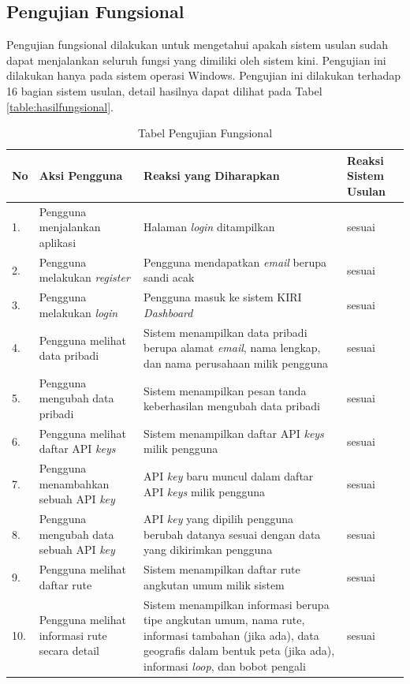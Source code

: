 \subsection{Pengujian Fungsional}
\label{sec:pengujianfungsional}
Pengujian fungsional dilakukan untuk mengetahui apakah sistem usulan sudah dapat menjalankan seluruh fungsi yang dimiliki oleh sistem kini. Pengujian ini dilakukan hanya pada sistem operasi Windows. Pengujian ini dilakukan terhadap 16 bagian sistem usulan, detail hasilnya dapat dilihat pada Tabel \ref{table:hasilfungsional}.

\begin{table}[H]
	\centering
	\caption{Tabel Pengujian Fungsional}
		\begin{tabular}{|p{0.37cm}| p{3.5cm}| p{7cm}| p{2.5cm}|} \hline
		No & Aksi Pengguna	& Reaksi yang Diharapkan & Reaksi Sistem Usulan \\ \hline
		1. & Pengguna menjalankan aplikasi & Halaman \textit{login} ditampilkan & sesuai \\ \hline
		2. & Pengguna melakukan \textit{register} & Pengguna mendapatkan \textit{email} berupa sandi acak & sesuai \\ \hline
		3. & Pengguna melakukan \textit{login} & Pengguna masuk ke sistem KIRI \textit{Dashboard} & sesuai	\\ \hline
		4. & Pengguna melihat data pribadi & Sistem menampilkan data pribadi berupa alamat \textit{email}, nama lengkap, dan nama perusahaan milik pengguna & sesuai \\ \hline
		5. & Pengguna mengubah data pribadi & Sistem menampilkan pesan tanda keberhasilan mengubah data pribadi & sesuai\\ \hline
		6. & Pengguna melihat daftar API \textit{keys} & Sistem menampilkan daftar API \textit{keys} milik pengguna & sesuai \\ \hline
		7. & Pengguna menambahkan sebuah API \textit{key} & API \textit{key} baru muncul dalam daftar API \textit{keys} milik pengguna & sesuai \\ \hline
		8. & Pengguna mengubah data sebuah API \textit{key} & API \textit{key} yang dipilih pengguna berubah datanya sesuai dengan data yang dikirimkan pengguna & sesuai \\ \hline
		9. & Pengguna melihat daftar rute & Sistem menampilkan daftar rute angkutan umum milik sistem & sesuai \\ \hline
		10. & Pengguna melihat informasi rute secara detail & Sistem menampilkan informasi berupa tipe angkutan umum, nama rute, informasi tambahan (jika ada), data geografis dalam bentuk peta (jika ada), informasi \textit{loop}, dan bobot pengali & sesuai \\ \hline

\end{tabular}
\end{table}
